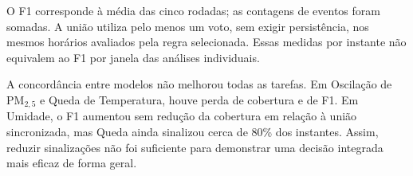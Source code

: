 O F1 corresponde à média das cinco rodadas; as contagens de
eventos foram somadas. A união utiliza pelo menos um voto,
sem exigir persistência, nos mesmos horários avaliados pela
regra selecionada. Essas medidas por instante não equivalem
ao F1 por janela das análises individuais.

A concordância entre modelos não melhorou todas as tarefas.
Em Oscilação de PM$_{2,5}$ e Queda de Temperatura, houve perda
de cobertura e de F1. Em Umidade, o F1 aumentou sem redução
da cobertura em relação à união sincronizada, mas Queda ainda
sinalizou cerca de 80\% dos instantes. Assim, reduzir sinalizações
não foi suficiente para demonstrar uma decisão integrada mais
eficaz de forma geral.

